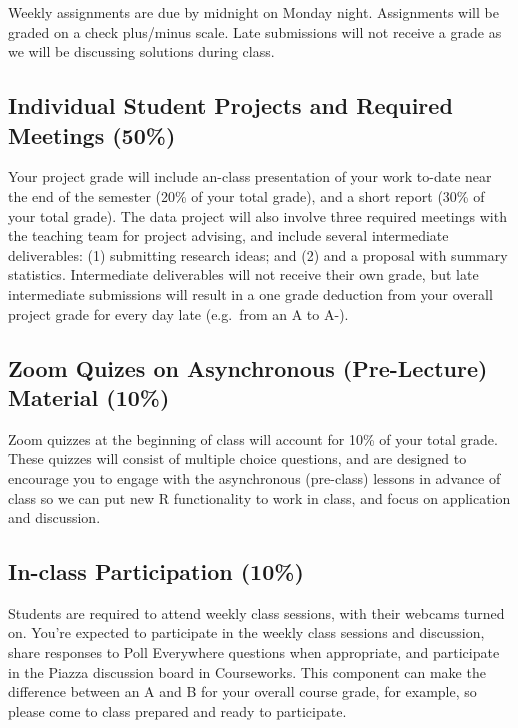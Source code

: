 \documentclass[11pt,]{article}
\begin{document}
Weekly assignments are due by midnight on Monday night. Assignments will
be graded on a check plus/minus scale. Late submissions will not receive
a grade as we will be discussing solutions during class.

\hypertarget{individual-student-projects-and-required-meetings-50}{%
\subsection{Individual Student Projects and Required Meetings
(50\%)}\label{individual-student-projects-and-required-meetings-50}}

Your project grade will include an-class presentation of your work
to-date near the end of the semester (20\% of your total grade), and a
short report (30\% of your total grade). The data project will also
involve three required meetings with the teaching team for project
advising, and include several intermediate deliverables: (1) submitting
research ideas; and (2) and a proposal with summary statistics.
Intermediate deliverables will not receive their own grade, but late
intermediate submissions will result in a one grade deduction from your
overall project grade for every day late (e.g.~from an A to A-).

\hypertarget{zoom-quizes-on-asynchronous-pre-lecture-material-10}{%
\subsection{Zoom Quizes on Asynchronous (Pre-Lecture) Material
(10\%)}\label{zoom-quizes-on-asynchronous-pre-lecture-material-10}}

Zoom quizzes at the beginning of class will account for 10\% of your
total grade. These quizzes will consist of multiple choice questions,
and are designed to encourage you to engage with the asynchronous
(pre-class) lessons in advance of class so we can put new R
functionality to work in class, and focus on application and discussion.

\hypertarget{in-class-participation-10}{%
\subsection{In-class Participation
(10\%)}\label{in-class-participation-10}}

Students are required to attend weekly class sessions, with their
webcams turned on. You're expected to participate in the weekly class
sessions and discussion, share responses to Poll Everywhere questions
when appropriate, and participate in the Piazza discussion board in
Courseworks. This component can make the difference between an A and B
for your overall course grade, for example, so please come to class
prepared and ready to participate.
\end{document}
